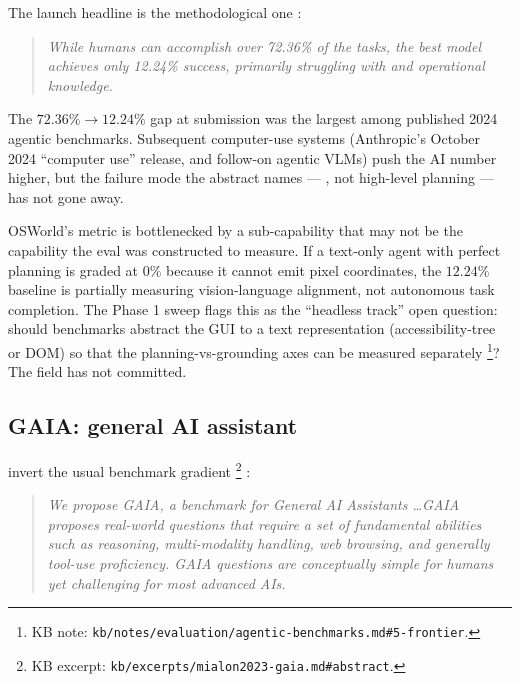 The launch headline is the methodological one
\citep[\S{}abstract]{xie2024-osworld}:

\begin{quote}\itshape
While humans can accomplish over 72.36\% of the tasks, the best model
achieves only 12.24\% success, primarily struggling with 
and operational knowledge.
\end{quote}

The $72.36\% \to 12.24\%$ gap at submission was the largest among
published 2024 agentic benchmarks. Subsequent computer-use systems
(Anthropic's October 2024 ``computer use''  release, and
follow-on agentic VLMs) push the AI number higher, but the failure
mode the abstract names --- , not high-level planning
--- has not gone away.

\begin{contradiction}
OSWorld's metric is bottlenecked by a sub-capability that may not be
the capability the eval was constructed to measure. If a text-only
agent with perfect planning is graded at $0\%$ because it cannot
emit pixel coordinates, the $12.24\%$ baseline is partially measuring
vision-language alignment, not autonomous task completion. The Phase
1 sweep flags this as the ``headless track'' open question: should
benchmarks abstract the GUI to a text representation
(accessibility-tree or DOM) so that the planning-vs-grounding axes
can be measured separately%
\footnote{KB note: \nolinkurl{kb/notes/evaluation/agentic-benchmarks.md#5-frontier}.}?
The field has not committed.
\end{contradiction}

\subsection{GAIA: general AI assistant}
\label{sec:agentic-gaia}

\citet{mialon2023-gaia} invert the usual benchmark gradient%
\footnote{KB excerpt: \nolinkurl{kb/excerpts/mialon2023-gaia.md#abstract}.}
\citep[\S{}abstract]{mialon2023-gaia}:

\begin{quote}\itshape
We propose GAIA, a benchmark for General AI Assistants \ldots GAIA
proposes real-world questions that require a set of fundamental
abilities such as reasoning, multi-modality handling, web browsing,
and generally tool-use proficiency. GAIA questions are conceptually
simple for humans yet challenging for most advanced AIs.
\end{quote}

